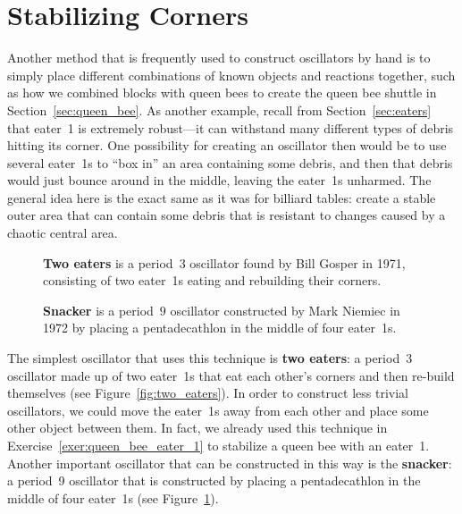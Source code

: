 \section{Stabilizing Corners}\label{sec:corner_oscillators}

Another method that is frequently used to construct oscillators by hand is to simply place different combinations of known objects and reactions together, such as how we combined blocks with queen bees to create the queen bee shuttle in Section~\ref{sec:queen_bee}. As another example, recall from Section~\ref{sec:eaters} that eater~1 is extremely robust---it can withstand many different types of debris hitting its corner. One possibility for creating an oscillator then would be to use several eater~1s to ``box in'' an area containing some debris, and then that debris would just bounce around in the middle, leaving the eater~1s unharmed. The general idea here is the exact same as it was for billiard tables: create a stable outer area that can contain some debris that is resistant to changes caused by a chaotic central area.

\begin{figure}[!htb]
	\centering
	\begin{minipage}{.48\textwidth}
		\centering
		\caption{\textbf{Two eaters} is a period~$3$ oscillator found by Bill Gosper in 1971, consisting of two eater~1s eating and rebuilding their corners.}\label{fig:two_eaters}
	\end{minipage} \hfill %
	\begin{minipage}{.48\textwidth}
		\centering
		\caption{\textbf{Snacker} is a period~$9$ oscillator constructed by Mark Niemiec in 1972 by placing a pentadecathlon in the middle of four eater~1s.}\label{fig:snacker}
	\end{minipage}
\end{figure}

The simplest oscillator that uses this technique is \textbf{two eaters}: a period~$3$ oscillator made up of two eater~1s that eat each other's corners and then re-build themselves (see Figure~\ref{fig:two_eaters}). In order to construct less trivial oscillators, we could move the eater~1s away from each other and place some other object between them. In fact, we already used this technique in Exercise~\ref{exer:queen_bee_eater_1} to stabilize a queen bee with an eater~1. Another important oscillator that can be constructed in this way is the \textbf{snacker}: a period~9 oscillator that is constructed by placing a pentadecathlon in the middle of four eater~1s (see Figure~\ref{fig:snacker}).

